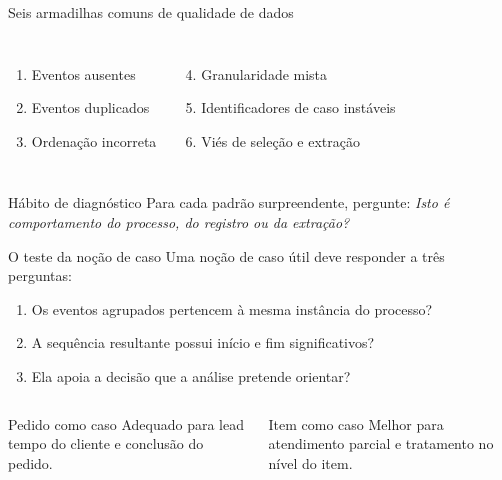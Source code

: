 \documentclass[aspectratio=169,11pt]{beamer}
\begin{document}
\begin{frame}{Seis armadilhas comuns de qualidade de dados}
  \begin{columns}[T,onlytextwidth]
      \begin{enumerate}
        \item Eventos ausentes
        \item Eventos duplicados
        \item Ordenação incorreta
      \end{enumerate}
      \begin{enumerate}
        \setcounter{enumi}{3}
        \item Granularidade mista
        \item Identificadores de caso instáveis
        \item Viés de seleção e extração
      \end{enumerate}
  \end{columns}
  \vspace{0.55cm}
  \begin{block}{Hábito de diagnóstico}
    Para cada padrão surpreendente, pergunte: \textit{Isto é comportamento do processo, do registro ou da extração?}
  \end{block}
\end{frame}

\begin{frame}{O teste da noção de caso}
  Uma noção de caso útil deve responder a três perguntas:
  \begin{enumerate}
    \item Os eventos agrupados pertencem à mesma instância do processo?
    \item A sequência resultante possui início e fim significativos?
    \item Ela apoia a decisão que a análise pretende orientar?
  \end{enumerate}
  \vspace{0.4cm}
  \begin{columns}[T,onlytextwidth]
      \begin{block}{Pedido como caso}
        Adequado para lead tempo do cliente e conclusão do pedido.
      \end{block}
      \begin{block}{Item como caso}
        Melhor para atendimento parcial e tratamento no nível do item.
      \end{block}
  \end{columns}
\end{frame}
\end{document}
